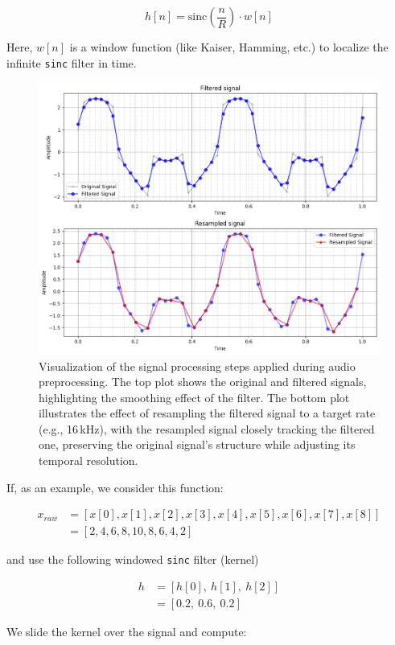 \documentclass[conference]{IEEEtran}
\begin{document}
$$h[n] = \text{sinc}\left(\frac{n}{R}\right) \cdot w[n]$$

Here, $w[n]$ is a window function (like Kaiser, Hamming, etc.) to localize the infinite \texttt{sinc} filter in time.


\begin{figure}[H]
	\centering
	\includegraphics[width=0.9\linewidth]{img/img-resampling}
	\caption{Visualization of the signal processing steps applied during audio preprocessing. The top plot shows the original and filtered signals, highlighting the smoothing effect of the filter. The bottom plot illustrates the effect of resampling the filtered signal to a target rate (e.g., 16\,kHz), with the resampled signal closely tracking the filtered one, preserving the original signal’s structure while adjusting its temporal resolution.}
	\label{fig:img-resampling}
\end{figure}


If, as an example, we consider this function:

\begin{align*}
	x_{raw} &=[x[0], x[1], x[2], x[3], x[4], x[5], x[6], x[7], x[8]]\\
		 	&=[2, 4, 6, 8, 10, 8, 6, 4, 2]
\end{align*}

and use the following windowed \texttt{sinc} filter (kernel)

\begin{align*}
	h &= [h[0],\ h[1],\ h[2]]\\
	  &= [0.2,\ 0.6,\ 0.2]
\end{align*}

We slide the kernel over the signal and compute:
\end{document}
